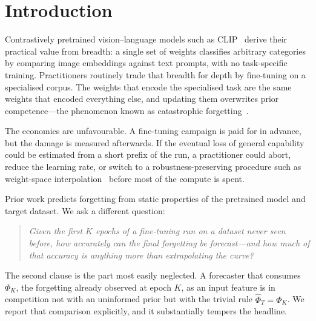 \documentclass[manuscript,nonacm]{acmart}
\begin{document}
\section{Introduction}
Contrastively pretrained vision--language models such as
CLIP~\cite{radford2021clip} derive their practical value from breadth: a single set of
weights classifies arbitrary categories by comparing image embeddings against text
prompts, with no task-specific training. Practitioners routinely trade that breadth for
depth by fine-tuning on a specialised corpus. The weights that encode the specialised
task are the same weights that encoded everything else, and updating them overwrites
prior competence---the phenomenon known as catastrophic
forgetting~\cite{mccloskey1989,kirkpatrick2017ewc}.

The economics are unfavourable. A fine-tuning campaign is paid for in advance, but the
damage is measured afterwards. If the eventual loss of general capability could be
estimated from a short prefix of the run, a practitioner could abort, reduce the
learning rate, or switch to a robustness-preserving procedure such as weight-space
interpolation~\cite{wortsman2022wiseft,ilharco2022patching} before most of the compute
is spent.

Prior work predicts forgetting from static properties of the pretrained model and target
dataset. We ask a different question:

\begin{quote}
\emph{Given the first $K$ epochs of a fine-tuning run on a dataset never seen before,
how accurately can the final forgetting be forecast---and how much of that accuracy is
anything more than extrapolating the curve?}
\end{quote}

The second clause is the part most easily neglected. A forecaster that consumes
$\Phi_K$, the forgetting already observed at epoch $K$, as an input feature is in
competition not with an uninformed prior but with the trivial rule $\hat\Phi_T=\Phi_K$.
We report that comparison explicitly, and it substantially tempers the headline.
\end{document}
